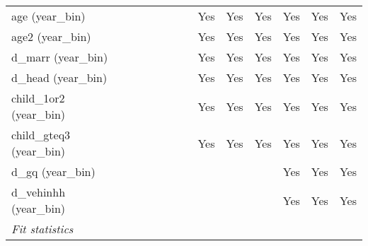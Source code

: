 \begin{tabular}{lcccccccccccc}
   age (year\_bin)                         &               &                       &                     &               &                       &                     & Yes           & Yes                   & Yes                 & Yes           & Yes                   & Yes\\  
   age2 (year\_bin)                        &               &                       &                     &               &                       &                     & Yes           & Yes                   & Yes                 & Yes           & Yes                   & Yes\\  
   d\_marr (year\_bin)                     &               &                       &                     &               &                       &                     & Yes           & Yes                   & Yes                 & Yes           & Yes                   & Yes\\  
   d\_head (year\_bin)                     &               &                       &                     &               &                       &                     & Yes           & Yes                   & Yes                 & Yes           & Yes                   & Yes\\  
   child\_1or2 (year\_bin)                 &               &                       &                     &               &                       &                     & Yes           & Yes                   & Yes                 & Yes           & Yes                   & Yes\\  
   child\_gteq3 (year\_bin)                &               &                       &                     &               &                       &                     & Yes           & Yes                   & Yes                 & Yes           & Yes                   & Yes\\  
   d\_gq (year\_bin)                       &               &                       &                     &               &                       &                     &               &                       &                     & Yes           & Yes                   & Yes\\  
   d\_vehinhh (year\_bin)                  &               &                       &                     &               &                       &                     &               &                       &                     & Yes           & Yes                   & Yes\\  
   \midrule
   \emph{Fit statistics}\\

\end{tabular}
